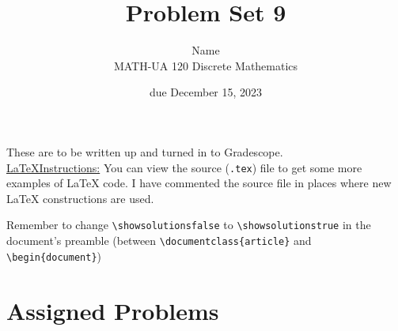 \documentclass{article}
\title{Problem Set 9}
\author{%
    Name
\\  MATH-UA 120 Discrete Mathematics
}
\date{due December 15, 2023}
\newif\ifshowsolutions
\newcommand{\danger}{\marginpar[\hfill\dbend]{\dbend\hfill}}
\theoremstyle{definition}
\begin{document}
\maketitle



These are to be written up and turned in to Gradescope.\\



\ifshowsolutions
    \SetupExSheets{solution/print=true}
\else
    \danger
 \underline{ \LaTeX  Instructions:}  You can view the source (\texttt{.tex}) file to get some more examples of \LaTeX{} code.  I have commented the source file in places where new \LaTeX{} constructions are used.
  
  Remember to change \verb|\showsolutionsfalse| to \verb|\showsolutionstrue|
    in the document's preamble 
    (between \verb|\documentclass{article}| and \verb|\begin{document}|)
\fi

\section*{Assigned Problems}
\end{document}
